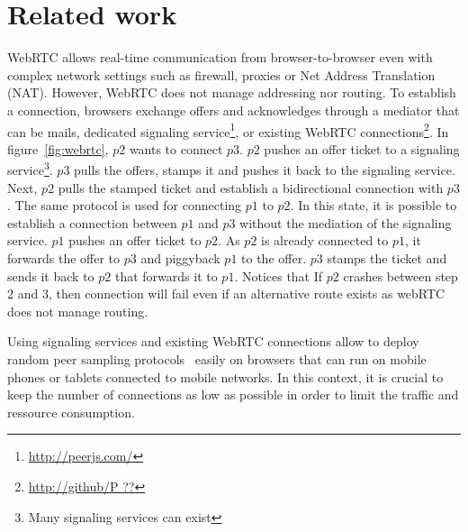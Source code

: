 
\begin{figure*}
\centering
{}
\hspace{20pt}
\hspace{20pt}
\caption{\label{fig:webrtc}Creating an overlay network on top of WebRTC.}
\end{figure*}


\section{Related work}
\label{sec:relatedwork}


WebRTC allows real-time communication from browser-to-browser even
with complex network settings such as firewall, proxies or Net Address
Translation (NAT). However, WebRTC does not manage addressing nor
routing. To establish a connection, browsers exchange offers
and acknowledges through a mediator that can be mails, dedicated
signaling service\footnote{\url{http://peerjs.com/}}, or existing
WebRTC connections\footnote{\url{http://github/P ??}}. In
figure~\ref{fig:webrtc}, $p2$ wants to connect $p3$. $p2$ pushes an
offer ticket to a signaling service\footnote{Many signaling services
  can exist}. $p3$ pulls the offers, stamps it and pushes it back to
the signaling service. Next, $p2$ pulls the stamped ticket and
establish a bidirectional connection with $p3$. The same protocol is
used for connecting $p1$ to $p2$. In this state, it is possible to
establish a connection between $p1$ and $p3$ without the mediation of
the signaling service. $p1$ pushes an offer ticket to $p2$.  As $p2$
is already connected to $p1$, it forwards the offer to $p3$ and
piggyback $p1$ to the offer. $p3$ stamps the ticket and sends it back
to $p2$ that forwards it to $p1$. Notices that If $p2$ crashes between
step 2 and 3, then connection will fail even if an alternative route
exists as webRTC does not manage routing.  

Using signaling services and existing WebRTC connections allow to
deploy random peer sampling protocols~\cite{jelasity2004peer} easily
on browsers that can run on mobile phones or tablets connected to
mobile networks. In this context, it is crucial to keep the number of
connections as low as possible in order to limit the traffic and
ressource consumption. 


